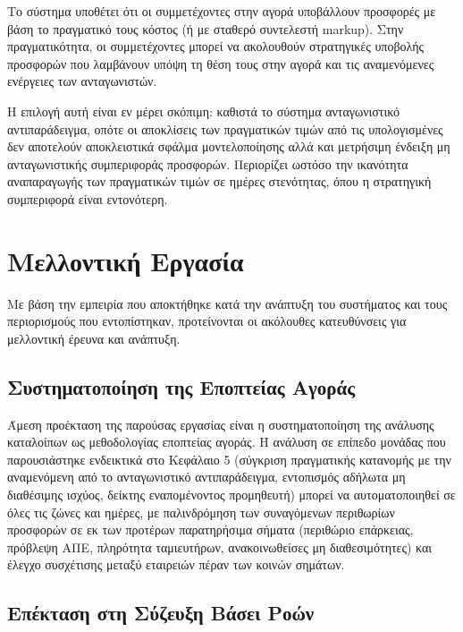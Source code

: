 Το σύστημα υποθέτει ότι οι συμμετέχοντες στην αγορά υποβάλλουν προσφορές με βάση το πραγματικό τους κόστος (ή με σταθερό συντελεστή markup). Στην πραγματικότητα, οι συμμετέχοντες μπορεί να ακολουθούν στρατηγικές υποβολής προσφορών που λαμβάνουν υπόψη τη θέση τους στην αγορά και τις αναμενόμενες ενέργειες των ανταγωνιστών.

Η επιλογή αυτή είναι εν μέρει σκόπιμη: καθιστά το σύστημα ανταγωνιστικό αντιπαράδειγμα, οπότε οι αποκλίσεις των πραγματικών τιμών από τις υπολογισμένες δεν αποτελούν αποκλειστικά σφάλμα μοντελοποίησης αλλά και μετρήσιμη ένδειξη μη ανταγωνιστικής συμπεριφοράς προσφορών. Περιορίζει ωστόσο την ικανότητα αναπαραγωγής των πραγματικών τιμών σε ημέρες στενότητας, όπου η στρατηγική συμπεριφορά είναι εντονότερη.


\section{Μελλοντική Εργασία}
\label{sec:future-work}

Με βάση την εμπειρία που αποκτήθηκε κατά την ανάπτυξη του συστήματος και τους περιορισμούς που εντοπίστηκαν, προτείνονται οι ακόλουθες κατευθύνσεις για μελλοντική έρευνα και ανάπτυξη.

\subsection{Συστηματοποίηση της Εποπτείας Αγοράς}
\label{subsec:market-monitoring-future}

Άμεση προέκταση της παρούσας εργασίας είναι η συστηματοποίηση της ανάλυσης καταλοίπων ως μεθοδολογίας εποπτείας αγοράς. Η ανάλυση σε επίπεδο μονάδας που παρουσιάστηκε ενδεικτικά στο Κεφάλαιο 5 (σύγκριση πραγματικής κατανομής με την αναμενόμενη από το ανταγωνιστικό αντιπαράδειγμα, εντοπισμός αδήλωτα μη διαθέσιμης ισχύος, δείκτης εναπομένοντος προμηθευτή) μπορεί να αυτοματοποιηθεί σε όλες τις ζώνες και ημέρες, με παλινδρόμηση των συναγόμενων περιθωρίων προσφορών σε εκ των προτέρων παρατηρήσιμα σήματα (περιθώριο επάρκειας, πρόβλεψη ΑΠΕ, πληρότητα ταμιευτήρων, ανακοινωθείσες μη διαθεσιμότητες) και έλεγχο συσχέτισης μεταξύ εταιρειών πέραν των κοινών σημάτων.

\subsection{Επέκταση στη Σύζευξη Βάσει Ροών}
\label{subsec:flow-based-future}

